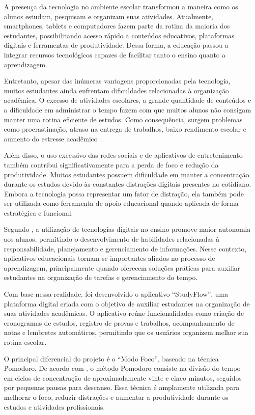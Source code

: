 \documentclass[12pt]{article}
\begin{document}
A presença da tecnologia no ambiente escolar transformou a maneira como os alunos estudam, pesquisam e organizam suas atividades. Atualmente, smartphones, tablets e computadores fazem parte da rotina da maioria dos estudantes, possibilitando acesso rápido a conteúdos educativos, plataformas digitais e ferramentas de produtividade. Dessa forma, a educação passou a integrar recursos tecnológicos capazes de facilitar tanto o ensino quanto a aprendizagem.

Entretanto, apesar das inúmeras vantagens proporcionadas pela tecnologia, muitos estudantes ainda enfrentam dificuldades relacionadas à organização acadêmica. O excesso de atividades escolares, a grande quantidade de conteúdos e a dificuldade em administrar o tempo fazem com que muitos alunos não consigam manter uma rotina eficiente de estudos. Como consequência, surgem problemas como procrastinação, atraso na entrega de trabalhos, baixo rendimento escolar e aumento do estresse acadêmico~\cite{bacich2018}.

Além disso, o uso excessivo das redes sociais e de aplicativos de entretenimento também contribui significativamente para a perda de foco e redução da produtividade. Muitos estudantes possuem dificuldade em manter a concentração durante os estudos devido às constantes distrações digitais presentes no cotidiano. Embora a tecnologia possa representar um fator de distração, ela também pode ser utilizada como ferramenta de apoio educacional quando aplicada de forma estratégica e funcional.

Segundo , a utilização de tecnologias digitais no ensino promove maior autonomia aos alunos, permitindo o desenvolvimento de habilidades relacionadas à responsabilidade, planejamento e gerenciamento de informações. Nesse contexto, aplicativos educacionais tornam-se importantes aliados no processo de aprendizagem, principalmente quando oferecem soluções práticas para auxiliar estudantes na organização de tarefas e gerenciamento do tempo.

Com base nessa realidade, foi desenvolvido o aplicativo “StudyFlow”, uma plataforma digital criada com o objetivo de auxiliar estudantes na organização de suas atividades acadêmicas. O aplicativo reúne funcionalidades como criação de cronogramas de estudos, registro de provas e trabalhos, acompanhamento de notas e lembretes automáticos, permitindo que os usuários organizem melhor sua rotina escolar.

O principal diferencial do projeto é o “Modo Foco”, baseado na técnica Pomodoro. De acordo com , o método Pomodoro consiste na divisão do tempo em ciclos de concentração de aproximadamente vinte e cinco minutos, seguidos por pequenas pausas para descanso. Essa técnica é amplamente utilizada para melhorar o foco, reduzir distrações e aumentar a produtividade durante os estudos e atividades profissionais.
\end{document}
